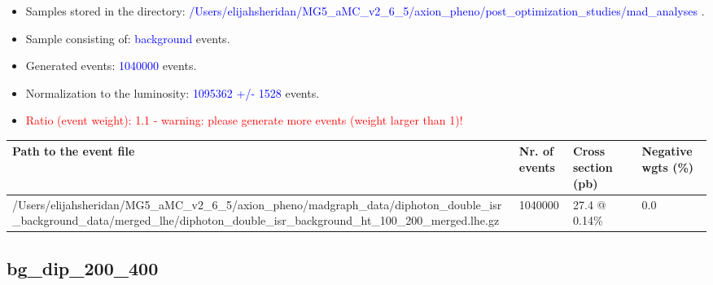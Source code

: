 \documentclass[a4paper, 10pt]{article}
\begin{document}
\begin{itemize}
  \item Samples stored in the directory: \textcolor{blue}{/\-Users/\-elijahsheridan/\-MG5\_aMC\_v2\_6\_5/\-axion\_pheno/\-post\_optimization\_studies/\-mad\_analyses} .
   \item Sample consisting of: \textcolor{blue}{background}  events.
   \item Generated events: \textcolor{blue}{1040000 }  events.
   \item Normalization to the luminosity: \textcolor{blue}{1095362}\textcolor{blue}{ +/\-- }\textcolor{blue}{1528 }  events.
   \item\textcolor{red}{Ratio (event weight): }\textcolor{red}{1.1 }\textcolor{red}{ - warning: please generate more events (weight larger than 1)!}
\textcolor{red}{}
\end{itemize}
\begin{table}[H]
  \begin{center}
    \begin{tabular}{|m{55.0mm}|m{25.0mm}|m{30.0mm}|m{30.0mm}|}
      \hline
      {\cellcolor{yellow}         Path to the event file}& {\cellcolor{yellow}         Nr. of events}& {\cellcolor{yellow}         Cross section (pb)}& {\cellcolor{yellow}         Negative wgts (\%)}\\
      \hline
      {\cellcolor{white}          /\-Users/\-elijahsheridan/\-MG5\_aMC\_v2\_6\_5/\-axion\_pheno/\-madgraph\_data/\-diphoton\_double\_isr\_background\_data/\-merged\_lhe/\-diphoton\_double\_isr\_background\_ht\_100\_200\_merged.lhe.gz}& {\cellcolor{white}          1040000}& {\cellcolor{white}          27.4 @ 0.14\%}& {\cellcolor{white}          0.0}\\
\hline
    \end{tabular}
  \end{center}
\end{table}

\subsection{ bg\_dip\_200\_400}
\end{document}

